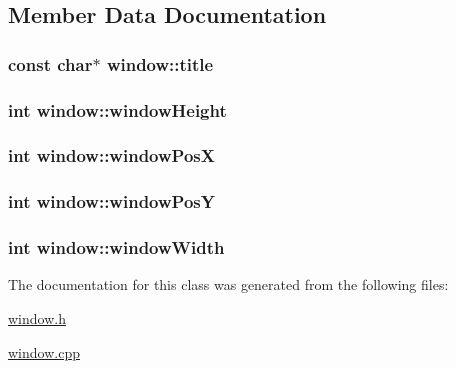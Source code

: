 \subsection{Member Data Documentation}
\hypertarget{classwindow_ab9e267a810e562b6895cbcb976553ce4}{
\subsubsection[{title}]{\setlength{\rightskip}{0pt plus 5cm}const char$\ast$ window\-::title}}\label{classwindow_ab9e267a810e562b6895cbcb976553ce4}
\hypertarget{classwindow_a3633faf034c24d6d41257bb350ee1abd}{
\subsubsection[{window\-Height}]{\setlength{\rightskip}{0pt plus 5cm}int window\-::window\-Height}}\label{classwindow_a3633faf034c24d6d41257bb350ee1abd}
\hypertarget{classwindow_a109e34f5c88eaeed18e66151538c2cce}{
\subsubsection[{window\-Pos\-X}]{\setlength{\rightskip}{0pt plus 5cm}int window\-::window\-Pos\-X}}\label{classwindow_a109e34f5c88eaeed18e66151538c2cce}
\hypertarget{classwindow_a5e842d772a02efe81db7d1ed93d54ac9}{
\subsubsection[{window\-Pos\-Y}]{\setlength{\rightskip}{0pt plus 5cm}int window\-::window\-Pos\-Y}}\label{classwindow_a5e842d772a02efe81db7d1ed93d54ac9}
\hypertarget{classwindow_aa9aa4134a5d5b34a3d3a9d21329f9d50}{
\subsubsection[{window\-Width}]{\setlength{\rightskip}{0pt plus 5cm}int window\-::window\-Width}}\label{classwindow_aa9aa4134a5d5b34a3d3a9d21329f9d50}


The documentation for this class was generated from the following files\-:\begin{DoxyCompactItemize}
\item 
\hyperlink{window_8h}{window.\-h}\item 
\hyperlink{window_8cpp}{window.\-cpp}\end{DoxyCompactItemize}

